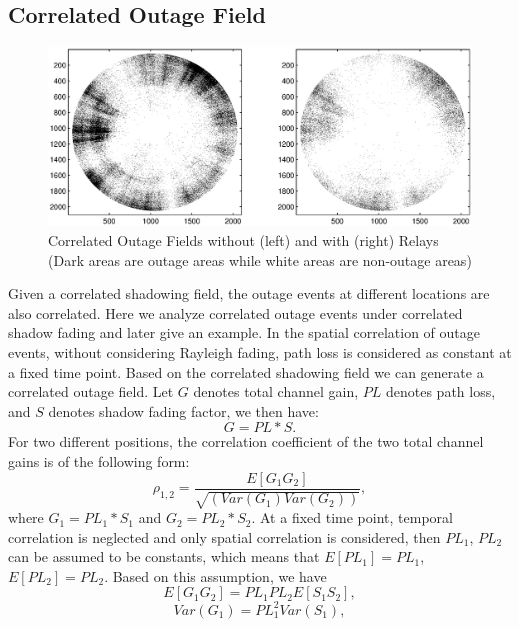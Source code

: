 \subsection{Correlated Outage Field}
\label{2:outagefield}
\begin{figure}
\centering
\includegraphics[width=12cm]{outagefield.eps}
\caption{Correlated Outage Fields without (left) and with (right) Relays (Dark areas are outage areas while white areas are non-outage areas)}
\label{2:outagefie}
\end{figure}
Given a correlated shadowing field, the outage events at different locations are also correlated. Here we analyze correlated outage events under correlated shadow fading and later give an example. In the spatial correlation of outage events, without considering Rayleigh fading, path loss is considered as constant at a fixed time point. Based on the correlated shadowing field we can generate a correlated outage field. Let $G$ denotes total channel gain, $PL$ denotes path loss, %
and $S$ denotes shadow fading factor, we then have:
\begin{equation}
G = PL* S.
\end{equation}
For two different positions, the correlation coefficient of the two total channel gains is of the following form:
\begin{equation}
\rho_{1,2} = \frac{E[G_{1}G_{2}]}{\sqrt{(Var(G_{1})Var(G_{2}))}},
\label{eq1}
\end{equation}
where $G_{1}=PL_{1}*S_{1}$ and $G_{2}=PL_{2}*S_{2}$.
At a fixed time point, temporal correlation is neglected and only spatial correlation is considered, then $PL_{1}$, $PL_{2}$ can be assumed to be constants, which means that $E[PL_{1}] = PL_{1}$, $E[PL_{2}] = PL_{2}$. Based on this assumption, we have
\begin{equation}
E[G_{1}G_{2}] = PL_{1}PL_{2}E[S_{1}S_{2}],
\label{eq2}
\end{equation}
\begin{equation}
Var(G_{1}) = PL_{1}^{2}Var(S_{1}),
\label{eq3}
\end{equation}
